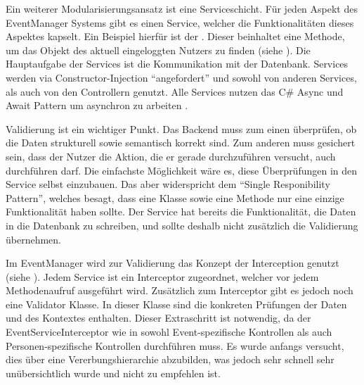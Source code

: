 Ein weiterer Modularisierungsansatz ist eine Serviceschicht. Für jeden Aspekt des EventManager Systems gibt es einen Service, welcher die Funktionalitäten dieses Aspektes kapselt. Ein Beispiel hierfür ist der . Dieser beinhaltet eine Methode, um das  Objekt des aktuell eingeloggten Nutzers zu finden (siehe ). Die Hauptaufgabe der Services ist die Kommunikation mit der Datenbank. Services werden via Constructor-Injection \enquote{angefordert} und sowohl von anderen Services, als auch von den Controllern genutzt. Alle Services nutzen das C\# Async und Await Pattern um asynchron zu arbeiten \cite{asyncAwait} \cite{tpl}.


Validierung ist ein wichtiger Punkt. Das Backend muss zum einen überprüfen, ob die Daten strukturell sowie semantisch korrekt sind. Zum anderen muss gesichert sein, dass der Nutzer die Aktion, die er gerade durchzuführen versucht, auch durchführen darf. Die einfachste Möglichkeit wäre es, diese Überprüfungen in den Service selbst einzubauen. Das aber widerspricht dem \enquote{Single Responibility Pattern}, welches besagt, dass eine Klasse sowie eine Methode nur eine einzige Funktionalität haben sollte. Der Service hat bereits die Funktionalität, die Daten in die Datenbank zu schreiben, und sollte deshalb nicht zusätzlich die Validierung übernehmen.



Im EventManager wird zur Validierung das Konzept der Interception genutzt (siehe ). Jedem Service ist ein Interceptor zugeordnet, welcher vor jedem Methodenaufruf ausgeführt wird. Zusätzlich zum Interceptor gibt es jedoch noch eine Validator Klasse. In dieser Klasse sind die konkreten Prüfungen der Daten und des Kontextes enthalten. Dieser Extraschritt ist notwendig, da \zB der EventServiceInterceptor wie in  sowohl Event-spezifische Kontrollen als auch Personen-spezifische Kontrollen durchführen muss. Es wurde anfangs versucht, dies über eine Vererbungshierarchie abzubilden, was jedoch sehr schnell sehr unübersichtlich wurde und nicht zu empfehlen ist.
